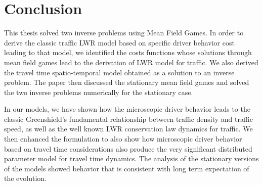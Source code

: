 \chapter{Conclusion}\label{sec:conclusion}%

This thesis solved two inverse problems using Mean Field Games. In order to derive the classic traffic LWR model based on specific driver behavior cost leading to that model, we identified the costs functions whose solutions through mean field games lead to the derivation of LWR model for traffic. We also derived the travel time spatio-temporal model obtained as a solution to an inverse problem. The paper then discussed the stationary mean field games and solved the two inverse problems numerically for the stationary case.

In our models, we have shown how the microscopic driver behavior leads to the classic Greenshield's fundamental relationship between traffic density and traffic speed, as well as the well known LWR conservation law dynamics for traffic.  We then enhanced the formulation to also show how microscopic driver behavior based on travel time considerations also produce the very significant distributed parameter model for travel time dynamics. The analysis of the stationary versions of the models showed behavior that is consistent with long term expectation of the evolution. 